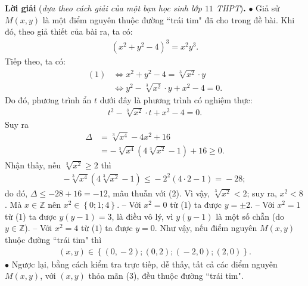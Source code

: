\begin{multicols}{2}
\begin{figure}[H]
	\end{figure}
	\textbf{\color{thachthuctoanhoc}Lời giải} (\textit{dựa theo cách giải của một bạn học sinh lớp $11$ THPT})\textbf{\color{thachthuctoanhoc}.}
	\vskip 0.05cm
	$\bullet$ Giả sử $M(x, y)$ là một điểm nguyên thuộc đường ``trái tim" đã cho trong đề bài. Khi đó, theo giả thiết của bài ra, ta có:
	\begin{align*}
		{\left( {{x^2} + {y^2} - 4} \right)^3} = {x^2}{y^3}. \tag{$1$}
	\end{align*}
	Tiếp theo, ta có:
	\begin{align*}
		(1) &\Leftrightarrow {x^2} + {y^2} - 4 = \sqrt[3]{{{x^2}}} \cdot y\\ &\Leftrightarrow {y^2} - \sqrt[3]{{{x^2}}} \cdot y + {x^2} - 4 = 0.
	\end{align*}
	Do đó, phương trình ẩn $t$ dưới đây là phương trình có nghiệm thực:
	\begin{align*}
		{t^2} - \sqrt[3]{{{x^2}}} \cdot t + {x^2} - 4 = 0.
	\end{align*}
	Suy ra
	\begin{align*}
		\Delta  &= \sqrt[3]{{{x^4}}} - 4{x^2} + 16 \\
		&=  - \sqrt[3]{{{x^4}}}\left( {4\sqrt[3]{{{x^2}}} - 1} \right) + 16 \ge 0. \tag{$2$}
	\end{align*}
	Nhận thấy, nếu $\sqrt[3]{{{x^2}}} \ge 2$  thì
	\begin{align*}
		-\! \sqrt[3]{{{x^4}}}\left( {4\sqrt[3]{{{x^2}}} \!-\! 1} \right) \le  \!-\! {2^2}\left( {4 \cdot 2 \!-\! 1} \right) =  \!-\! 28;
	\end{align*}
	do đó, $\Delta \le - 28 + 16 = -12$, mâu thuẫn với ($2$).
	\vskip 0.05cm
	Vì vậy, $\sqrt[3]{{{x^2}}} < 2$; suy ra, $x^2 < 8$. Mà $x \in \mathbb{Z}$ nên ${x^2} \in \left\{ {0;1;4} \right\}$.
	\vskip 0.05cm 
	-- Với $x^2 = 0$  từ ($1$) ta được $y = \pm 2$.
	\vskip 0.05cm 
	-- Với $x^2 = 1$  từ ($1$) ta được $y (y-1) = 3$,  là điều vô lý, vì $y(y-1)$  là một số chẵn (do  $y \in \mathbb{Z}$).
	\vskip 0.05cm
	-- Với $x^2 = 4$  từ ($1$) ta được $y = 0$.
	\vskip 0.05cm
	Như vậy, nếu điểm nguyên $M(x, y)$ thuộc đường ``trái tim" thì
	\begin{align*}
		\left( {x,y} \right) \!\in\! \left\{\! {\left( {0, \!-\! 2} \right)\!;\!\left( {0,2} \right)\!;\!\left( { \!-\! 2,0} \right)\!;\!\left( {2,0} \right)} \!\right\}. \tag{$3$}
	\end{align*}
	$\bullet$ Ngược lại, bằng cách kiểm tra trực tiếp, dễ thấy, tất cả các điểm nguyên $M(x, y)$, với $(x, y)$ thỏa mãn ($3$), đều thuộc đường ``trái tim".

\end{multicols}
